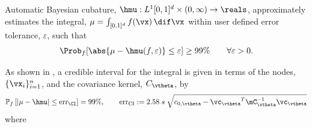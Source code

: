 Automatic Bayesian cubature, $\hmu: L^1[0,1]^d \times (0,\infty) \to \reals$, approximately estimates the integral, $\mu = \int_{[0,1]^d} f(\vx) \, \dif \vx$ within user defined error tolerance, $\varepsilon$, 
 such that 
\[
{\Prob_f  [ }\abs{ \mu - \hmu(f,\varepsilon)} \le \varepsilon 
{ ] \ge 99\%} \qquad \forall \varepsilon > 0.
\]

As shown in \cite{RatHic19a}, a credible interval for the integral is given in terms of the nodes, $\{\vx_i\}_{i=1}^n$, and the covariance kernel, $C_{\vtheta}$,  by 
\begin{equation*}
 \mathbb{P}_f \left[
|\mu-\hmu| \leq \text{err}_\CI
\right] = 99\%, \qquad
{\text{err}_{\text{CI}}} := 2.58 \; s \; \sqrt{c_{0,{\vtheta}} - {\vc_{\vtheta}}^T \mC_{\vtheta}^{-1}\vc_{\vtheta}}
\end{equation*}
where
